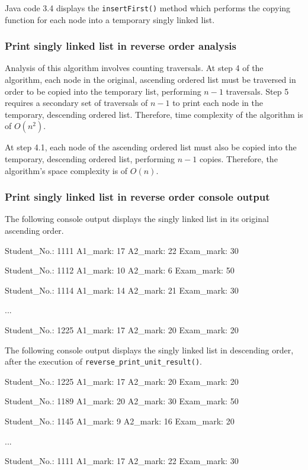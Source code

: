 \noindent
Java code 3.4 displays the \texttt{insertFirst()} method which performs the copying function for each node into a temporary singly linked list.

\subsubsection{Print singly linked list in reverse order analysis}

Analysis of this algorithm involves counting traversals. At step 4 of the algorithm, each node in the original, ascending ordered list must be traversed in order to be copied into the temporary list, performing $n - 1$ traversals. Step 5 requires a secondary set of traversals of $n - 1$ to print each node in the temporary, descending ordered list. Therefore, time complexity of the algorithm is of $O(n^2)$.

At step 4.1, each node of the ascending ordered list must also be copied into the temporary, descending ordered list, performing $n - 1$ copies. Therefore, the algorithm's space complexity is of $O(n)$.

\subsubsection{Print singly linked list in reverse order console output}

The following console output displays the singly linked list in its original ascending order.
\\
\begin{consolecode}
Student_No.: 1111
A1_mark: 17
A2_mark: 22
Exam_mark: 30

Student_No.: 1112
A1_mark: 10
A2_mark: 6
Exam_mark: 50

Student_No.: 1114
A1_mark: 14
A2_mark: 21
Exam_mark: 30

...

Student_No.: 1225
A1_mark: 17
A2_mark: 20
Exam_mark: 20
\end{consolecode}

\noindent
The following console output displays the singly linked list in descending order, after the execution of \texttt{reverse_print_unit_result()}.
\\
\begin{consolecode}
Student_No.: 1225
A1_mark: 17
A2_mark: 20
Exam_mark: 20

Student_No.: 1189
A1_mark: 20
A2_mark: 30
Exam_mark: 50

Student_No.: 1145
A1_mark: 9
A2_mark: 16
Exam_mark: 20

...

Student_No.: 1111
A1_mark: 17
A2_mark: 22
Exam_mark: 30
\end{consolecode}
